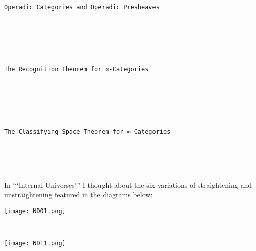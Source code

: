 \documentclass{book}
\theoremstyle{definition}
\renewcommand{\chapter}[1]{
\newpage
{
\Huge 
\begin{center}
\ \\
\ \\
\thispagestyle{empty}
\texttt{#1}
\end{center}}
\ \\
\ \\
}
\begin{document}
\chapter{Operadic Categories and Operadic Presheaves}

\chapter{The Recognition Theorem for ∞-Categories}

\chapter{The Classifying Space Theorem for ∞-Categories}




\iffalse
contractibility of the E's:

- For a locally contractible group?

https://en.wikipedia.org/wiki/Connection_(vector_bundle)
\fi

\iffalse
Next the B can be thought of as pushing all of the information into ∞-Cat
b can be throught of as pushing information into...

MAKE SURE TO INCLUDE //
\fi

\iffalse
\begin{center}
\texttt{[image: mastertable.png]}  \\
\end{center}
\fi

\thispagestyle{empty}

\newpage

\ \\

In ```Internal Universes''' I thought about the six variations of straightening and unstraightening featured in the diagrams below:\\


\begin{center}
\texttt{[image: ND01.png]} \\
\end{center}

\ \\

\begin{center}
\texttt{[image: ND11.png]} \\
\end{center}

\ \\
\end{document}
